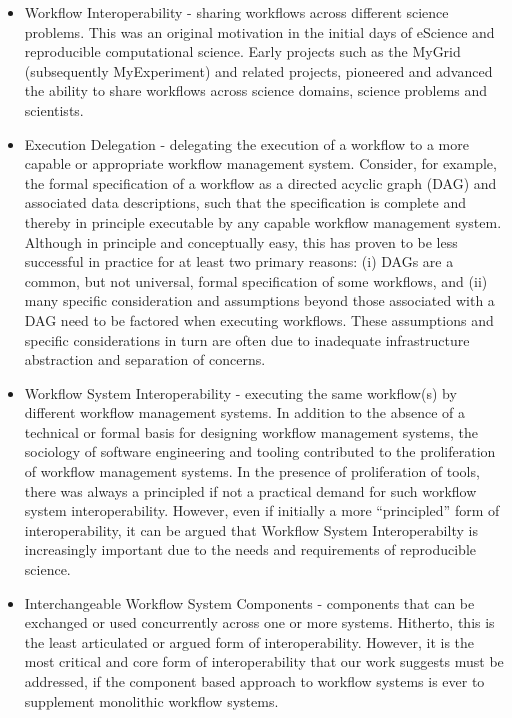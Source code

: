 \begin{itemize}

\item Workflow Interoperability - sharing workflows across different science
problems. This was an original motivation in the initial days of eScience  and
reproducible computational science. Early projects such as the MyGrid
(subsequently MyExperiment) and related projects, pioneered and advanced the
ability to share workflows across science domains, science  problems and
scientists.

\item Execution Delegation - delegating the execution of a workflow to a more
capable or appropriate workflow management system. Consider, for example, the formal specification of a workflow as a directed acyclic graph (DAG) and associated data descriptions, such that the specification is complete and thereby in principle executable by any capable workflow management system.  Although in principle and
conceptually easy, this has proven to be less successful in practice for at least
two primary reasons: (i) DAGs are a common, but not universal, formal specification of some workflows, and (ii) many specific consideration and assumptions beyond those
associated with a DAG need to be factored when executing workflows. These
assumptions and specific considerations in turn are often due to inadequate
infrastructure abstraction and separation of concerns. 

\item Workflow System Interoperability - executing the same workflow(s) by
different workflow management systems. In addition to the absence of a
technical or formal basis for designing workflow management systems, the
sociology of software engineering and tooling contributed to the proliferation
of workflow management systems. In the presence of proliferation of tools,
there was always a principled if not a practical demand for such workflow
system interoperability. However, even if initially a  more  ``principled'' form
of interoperability, it can be argued that Workflow System Interoperabilty is
increasingly important due to the needs and requirements of reproducible
science.

\item Interchangeable Workflow System Components - components that can be
exchanged or used concurrently across one or more systems. Hitherto, this is
the least articulated or argued form of interoperability. However, it is
the most critical and core form of interoperability that our work suggests 
must be addressed, if the component based approach to workflow systems is
ever to supplement monolithic workflow systems.

\end{itemize} 



